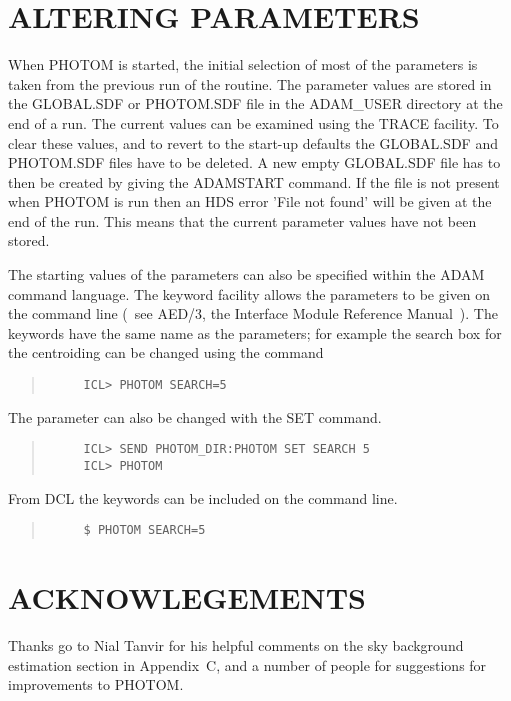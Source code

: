 \section{ALTERING PARAMETERS}

When PHOTOM is started, the initial selection of most of the parameters
is taken from the previous run of the routine. The parameter values are
stored in the GLOBAL.SDF or PHOTOM.SDF file in the ADAM\_USER directory
at the end of a run. The current values can be examined using the TRACE
facility. To clear these values, and to revert to the start-up defaults
the GLOBAL.SDF and PHOTOM.SDF files have to be deleted. A new empty
GLOBAL.SDF file has to then be created by giving the ADAMSTART command.
If the file is not present when PHOTOM is run then an HDS error 'File
not found' will be given at the end of the run. This means that the
current parameter values have not been stored.

The starting values of the parameters can also be specified within the
ADAM command language. The keyword facility allows the parameters to be
given on the command line (~see AED/3, the Interface Module Reference
Manual~). The keywords have the same name as the parameters; for example
the search box for the centroiding can be changed using the command
\begin{quote}
\begin{verbatim}
     ICL> PHOTOM SEARCH=5
\end{verbatim}
\end{quote}
The parameter can also be changed with the SET command.
\begin{quote}
\begin{verbatim}
     ICL> SEND PHOTOM_DIR:PHOTOM SET SEARCH 5
     ICL> PHOTOM
\end{verbatim}
\end{quote}

From DCL the keywords can be included on the command line.
\begin{quote}
\begin{verbatim}
     $ PHOTOM SEARCH=5
\end{verbatim}
\end{quote}

\section{ACKNOWLEGEMENTS}

Thanks go to Nial Tanvir for his helpful comments on the sky background
estimation section in Appendix~C, and a number of people for suggestions
for improvements to PHOTOM.


